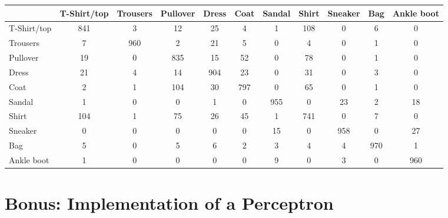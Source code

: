 \documentclass{article}
\begin{document}
\begin{table}[!ht]
\centering
      \begin{tabular}{|l||c|c|c|c|c|c|c|c|c|c|}
      \hline
                  & T-Shirt/top & Trousers & Pullover & Dress & Coat & Sandal & Shirt & Sneaker & Bag & Ankle boot \\ \hline \hline
      T-Shirt/top & 841         & 3        & 12       & 25    & 4    & 1      & 108   & 0       & 6   & 0          \\ \hline
      Trousers    & 7           & 960      & 2        & 21    & 5    & 0      & 4     & 0       & 1   & 0          \\ \hline
      Pullover    & 19          & 0        & 835      & 15    & 52   & 0      & 78    & 0       & 1   & 0          \\ \hline
      Dress       & 21          & 4        & 14       & 904   & 23   & 0      & 31    & 0       & 3   & 0          \\ \hline
      Coat        & 2           & 1        & 104      & 30    & 797  & 0      & 65    & 0       & 1   & 0          \\ \hline
      Sandal      & 1           & 0        & 0        & 1     & 0    & 955    & 0     & 23      & 2   & 18         \\ \hline
      Shirt       & 104         & 1        & 75       & 26    & 45   & 1      & 741   & 0       & 7   & 0          \\ \hline
      Sneaker     & 0           & 0        & 0        & 0     & 0    & 15     & 0     & 958     & 0   & 27         \\ \hline
      Bag         & 5           & 0        & 5        & 6     & 2    & 3      & 4     & 4       & 970 & 1          \\ \hline
      Ankle boot  & 1           & 0        & 0        & 0     & 0    & 9      & 0     & 3       & 0   & 960        \\ \hline
      \end{tabular}
      \end{table}

\clearpage
\section{Bonus: Implementation of a Perceptron}
\end{document}
